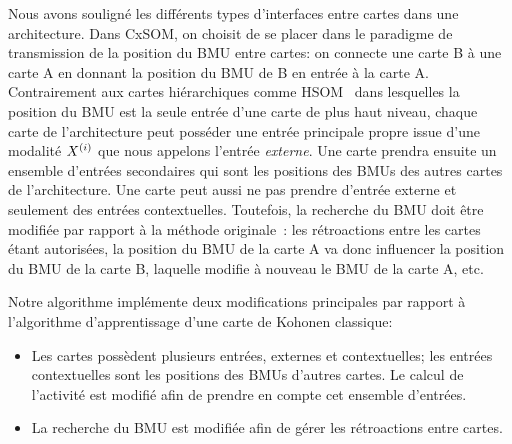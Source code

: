 \documentclass[../main]{subfiles}
\begin{document}
Nous avons souligné les différents types d'interfaces entre cartes dans une architecture.
Dans CxSOM, on choisit de se placer dans le paradigme de transmission de la position du BMU entre cartes: on connecte une carte B à une carte A en donnant la position du BMU de B en entrée à la carte A. 
Contrairement aux cartes hiérarchiques comme HSOM~\parencite{lampinen_clustering_1992} dans lesquelles la position du BMU est la seule entrée d'une carte de plus haut niveau, chaque carte de l'architecture peut posséder une entrée principale propre issue d'une modalité $X^{({i})}$ que nous appelons l'entrée \emph{externe}. 
Une carte prendra ensuite un ensemble d'entrées secondaires qui sont les positions des BMUs des autres cartes de l'architecture. 
Une carte peut aussi ne pas prendre d'entrée externe et seulement des entrées contextuelles.
Toutefois, la recherche du BMU doit être modifiée par rapport à la méthode originale~: les rétroactions entre les cartes étant autorisées, la position du BMU de la carte A va donc influencer la position du BMU de la carte B, laquelle modifie à nouveau le BMU de la carte A, etc. 

Notre algorithme implémente deux modifications principales par rapport à l'algorithme d'apprentissage d'une carte de Kohonen classique: 
\begin{itemize}
\item Les cartes possèdent plusieurs entrées, externes et contextuelles; les entrées contextuelles sont les positions des BMUs d'autres cartes. Le calcul de l'activité est modifié afin de prendre en compte cet ensemble d'entrées.
\item La recherche du BMU est modifiée afin de gérer les rétroactions entre cartes.
\end{itemize}
\end{document}
